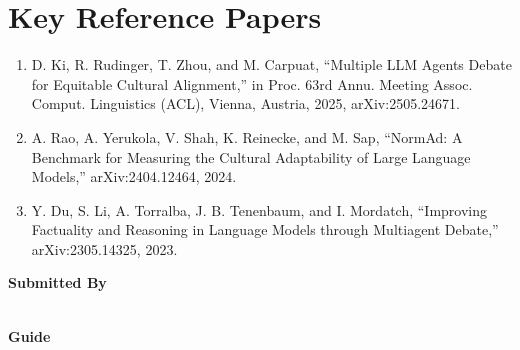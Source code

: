 \documentclass[11pt]{article}
\begin{document}
\section*{Key Reference Papers}
\begin{enumerate}
  \item D. Ki, R. Rudinger, T. Zhou, and M. Carpuat, ``Multiple LLM Agents Debate for Equitable Cultural Alignment,'' in Proc. 63rd Annu. Meeting Assoc. Comput. Linguistics (ACL), Vienna, Austria, 2025, arXiv:2505.24671.
  \item A. Rao, A. Yerukola, V. Shah, K. Reinecke, and M. Sap, ``NormAd: A Benchmark for Measuring the Cultural Adaptability of Large Language Models,'' arXiv:2404.12464, 2024.
  \item Y. Du, S. Li, A. Torralba, J. B. Tenenbaum, and I. Mordatch, ``Improving Factuality and Reasoning in Language Models through Multiagent Debate,'' arXiv:2305.14325, 2023.
\end{enumerate}
\vspace{0.8em}
\noindent\textbf{Submitted By}\\
\seminarName\\
\seminarRoll

\vspace{0.6em}
\noindent\textbf{Guide}\\
\seminarGuide
\end{document}
